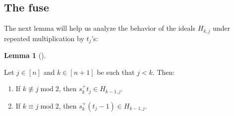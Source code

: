 \documentclass[numbers=enddot,12pt,final,onecolumn,notitlepage]{scrartcl}%
\theoremstyle{definition}
\newtheorem{lem}[theo]{Lemma}
\newenvironment{lemma}[1][]
{\begin{lem}[#1]\begin{leftbar}}
{\end{leftbar}\end{lem}}
\begin{document}
\subsection{The fuse}

The next lemma will help us analyze the behavior of the ideals $H_{k,j}$ under
repeated multiplication by $t_{j}$'s:

\begin{lemma}
\label{lem.4}Let $j\in\left[  n\right]  $ and $k\in\left[  n+1\right]  $ be
such that $j<k$. Then:

\begin{enumerate}
\item[\textbf{(a)}] If $k\not \equiv j\operatorname{mod}2$, then $s_{k}%
^{+}t_{j}\in H_{k-1,j}$.

\item[\textbf{(b)}] If $k\equiv j\operatorname{mod}2$, then $s_{k}^{+}\left(
t_{j}-1\right)  \in H_{k-1,j}$.
\end{enumerate}
\end{lemma}
\end{document}
